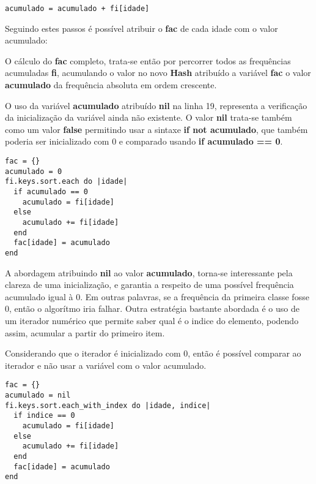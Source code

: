 \documentclass[espaco=simples,appendix=Name]{abnt}
\newcommand{\code}[1] {\textbf{#1}}
\begin{document}
\begin{lstlisting}[caption=Operador \code{+=} escrito de outra maneira ]
  acumulado = acumulado + fi[idade]
\end{lstlisting}

Seguindo estes passos é possível atribuir o \code{fac} de cada idade com o valor acumulado:

 

O cálculo do \code{fac} completo, trata-se então por percorrer todos as frequências acumuladas \code{fi}, acumulando o valor no novo \code{Hash} atribuído a variável \code{fac} o valor \code{acumulado} da frequência absoluta em ordem crescente.

 

O uso da variável \code{acumulado} atribuído \code{nil} na linha 19, representa a verificação da inicialização da variável ainda não existente. O valor \code{nil} trata-se também como um valor \code{false} permitindo usar a sintaxe \code{if not acumulado}, que também poderia ser inicializado com 0 e comparado usando \code{if acumulado == 0}.

\begin{lstlisting}[caption=Usando acumulado com valor inicial 0]
fac = {}
acumulado = 0 
fi.keys.sort.each do |idade|
  if acumulado == 0
    acumulado = fi[idade]
  else
    acumulado += fi[idade]
  end
  fac[idade] = acumulado
end
\end{lstlisting}

A abordagem atribuindo \code{nil} ao valor \code{acumulado}, torna-se interessante pela clareza de uma inicialização, e garantia a respeito de uma possível frequência acumulado igual à 0. Em outras palavras, se a frequência da primeira classe fosse 0, então o algorítmo iria falhar. Outra estratégia bastante abordada é o uso de um iterador numérico que permite saber qual é o indice do elemento, podendo assim, acumular a partir do primeiro item.

Considerando que o iterador é inicializado com 0, então é possível comparar ao iterador e não usar a variável com o valor acumulado.


\begin{lstlisting}[caption=Usando acumulado através do iterador \code{indice}, label=usa indice]
fac = {}
acumulado = nil
fi.keys.sort.each_with_index do |idade, indice|
  if indice == 0
    acumulado = fi[idade]
  else
    acumulado += fi[idade]
  end
  fac[idade] = acumulado
end
\end{lstlisting}
\end{document}
